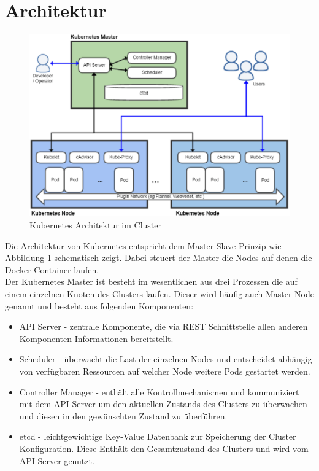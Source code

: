 \section{Architektur}
\begin{figure}
	\centering
	\includegraphics[width=0.9\linewidth]{figures/kubernetes-architecture}
	\caption[Kubernetes Architekture]{Kubernetes Architektur im Cluster}
	\label{fig:kubernetes-architecture}
\end{figure}
Die Architektur von Kubernetes entspricht dem Master-Slave Prinzip wie Abbildung \ref{fig:kubernetes-architecture} schematisch zeigt. Dabei steuert der Master die Nodes auf denen die Docker Container laufen.\\
Der Kubernetes Master ist besteht im wesentlichen aus drei Prozessen die auf einem einzelnen Knoten des Clusters laufen. Dieser wird häufig auch Master Node genannt und besteht aus folgenden Komponenten:
\begin{itemize}
	\item API Server - zentrale Komponente, die via REST Schnittstelle allen anderen Komponenten Informationen bereitstellt.
	\item Scheduler - überwacht die Last der einzelnen Nodes und entscheidet abhängig von verfügbaren Ressourcen auf welcher Node weitere Pods gestartet werden.
	\item Controller Manager - enthält alle Kontrollmechanismen und kommuniziert mit dem API Server um den aktuellen Zustands des Clusters zu überwachen und diesen in den gewünschten Zustand zu überführen.
	\item etcd - leichtgewichtige Key-Value Datenbank zur Speicherung der Cluster Konfiguration. Diese Enthält den Gesamtzustand des Clusters und wird vom API Server genutzt.
\end{itemize}\newpage
